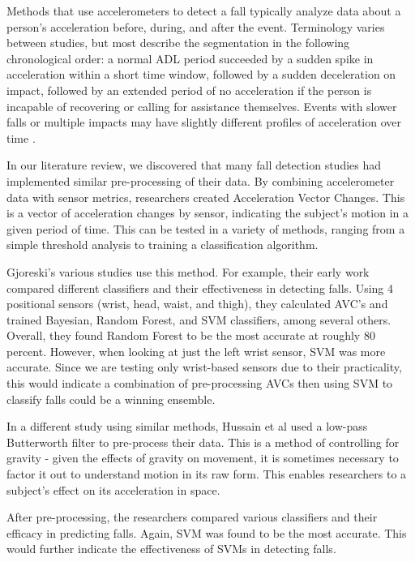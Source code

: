\documentclass{llncs}
\begin{document}
    Methods that use accelerometers to detect a fall typically analyze data about a person's acceleration before, during, and after the event. Terminology varies between studies, but most describe the segmentation in the following chronological order: a normal ADL period succeeded by a sudden spike in acceleration within a short time window, followed by a sudden deceleration on impact, followed by an extended period of no acceleration if the person is incapable of recovering or calling for assistance themselves. Events with slower falls or multiple impacts may have slightly different profiles of acceleration over time \cite{kangas2009sensitivity}.
    
    In our literature review, we discovered that many fall detection studies had implemented similar pre-processing of their data. By combining accelerometer data with sensor metrics, researchers created Acceleration Vector Changes. This is a vector of acceleration changes by sensor, indicating the subject's motion in a given period of time. This can be tested in a variety of methods, ranging from a simple threshold analysis to training a classification algorithm.
    
    Gjoreski's various studies use this method. For example, their early work compared different classifiers and their effectiveness in detecting falls. Using 4 positional sensors (wrist, head, waist, and thigh), they calculated AVC's and trained Bayesian, Random Forest, and SVM classifiers, among several others. Overall, they found Random Forest to be the most accurate at roughly 80 percent. However, when looking at just the left wrist sensor, SVM was more accurate. Since we are testing only wrist-based sensors due to their practicality, this would indicate a combination of pre-processing AVCs then using SVM to classify falls could be a winning ensemble. \cite{gjoreski2016accurately}
    
    In a different study using similar methods, Hussain et al used a low-pass Butterworth filter to pre-process their data. This is a method of controlling for gravity - given the effects of gravity on movement, it is sometimes necessary to factor it out to understand motion in its raw form. This enables researchers to a subject's effect on its acceleration in space.
    
    After pre-processing, the researchers compared various classifiers and their efficacy in predicting falls. Again, SVM was found to be the most accurate. This would further indicate the effectiveness of SVMs in detecting falls. \cite{hussainelderly2019}
    
\end{document}
